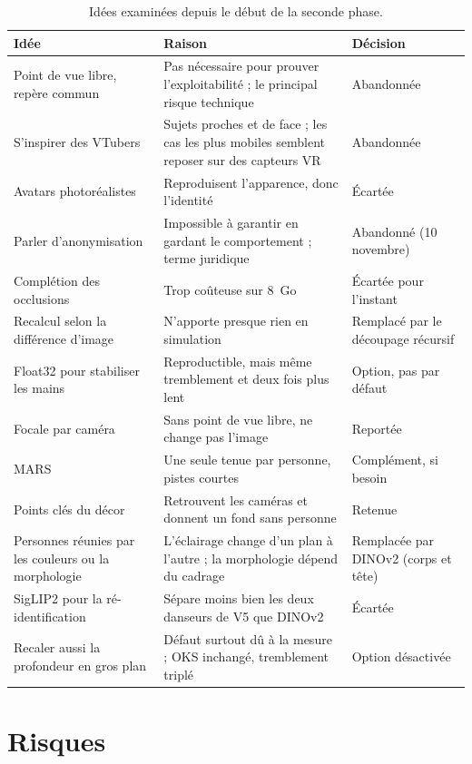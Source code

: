 \documentclass[11pt,a4paper]{report}
\begin{document}
\begin{table}[H]
\centering
\caption{Idées examinées depuis le début de la seconde phase.}
\label{tab:idees}
\small
\begin{tabularx}{\textwidth}{@{}>{\raggedright\arraybackslash}p{3.6cm}Y>{\raggedright\arraybackslash}p{2.8cm}@{}}
\toprule
Idée & Raison & Décision \\
\midrule
Point de vue libre, repère commun & Pas nécessaire pour prouver l'exploitabilité ; le principal risque technique & Abandonnée \\
S'inspirer des VTubers & Sujets proches et de face ; les cas les plus mobiles semblent reposer sur des capteurs VR & Abandonnée \\
Avatars photoréalistes & Reproduisent l'apparence, donc l'identité & Écartée \\
Parler d'anonymisation & Impossible à garantir en gardant le comportement ; terme juridique & Abandonné (10 novembre) \\
Complétion des occlusions & Trop coûteuse sur 8~Go & Écartée pour l'instant \\
Recalcul selon la différence d'image & N'apporte presque rien en simulation & Remplacé par le découpage récursif \\
Float32 pour stabiliser les mains & Reproductible, mais même tremblement et deux fois plus lent & Option, pas par défaut \\
Focale par caméra & Sans point de vue libre, ne change pas l'image & Reportée \\
MARS & Une seule tenue par personne, pistes courtes & Complément, si besoin \\
Points clés du décor & Retrouvent les caméras et donnent un fond sans personne & Retenue \\
Personnes réunies par les couleurs ou la morphologie & L'éclairage change d'un plan à l'autre ; la morphologie dépend du cadrage & Remplacée par DINOv2 (corps et tête) \\
SigLIP2 pour la ré-identification & Sépare moins bien les deux danseurs de V5 que DINOv2 & Écartée \\
Recaler aussi la profondeur en gros plan & Défaut surtout dû à la mesure ; OKS inchangé, tremblement triplé & Option désactivée \\
\bottomrule
\end{tabularx}
\end{table}

\section{Risques}
\end{document}

